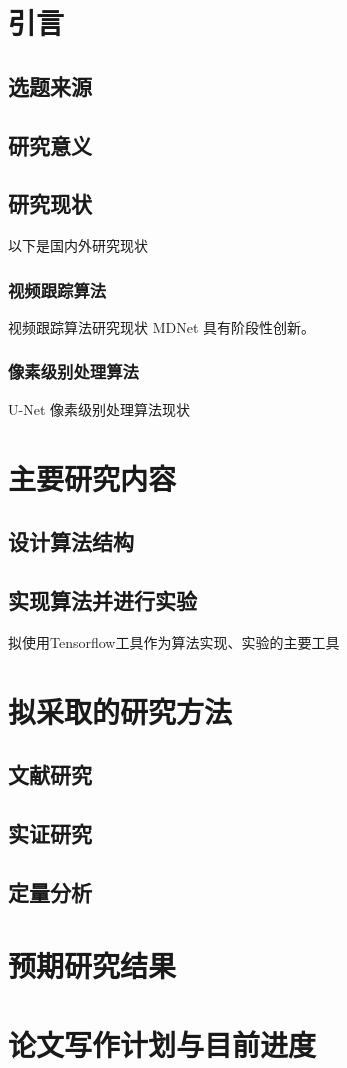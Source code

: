 
\chapter{引言}
\section{选题来源}
\section{研究意义}
\section{研究现状}
以下是国内外研究现状  
\subsection{视频跟踪算法}
视频跟踪算法研究现状  
MDNet \supercite{nam2016mdnet} 具有阶段性创新。
\subsection{像素级别处理算法}
U-Net\supercite{ronneberger2015u}
像素级别处理算法现状

\chapter{主要研究内容}
\section{设计算法结构}
\section{实现算法并进行实验}
拟使用Tensorflow\supercite{abadi2016tensorflow}工具作为算法实现、实验的主要工具

\chapter{拟采取的研究方法}
\section{文献研究}
\section{实证研究}
\section{定量分析}

\chapter{预期研究结果}
\chapter{论文写作计划与目前进度}

